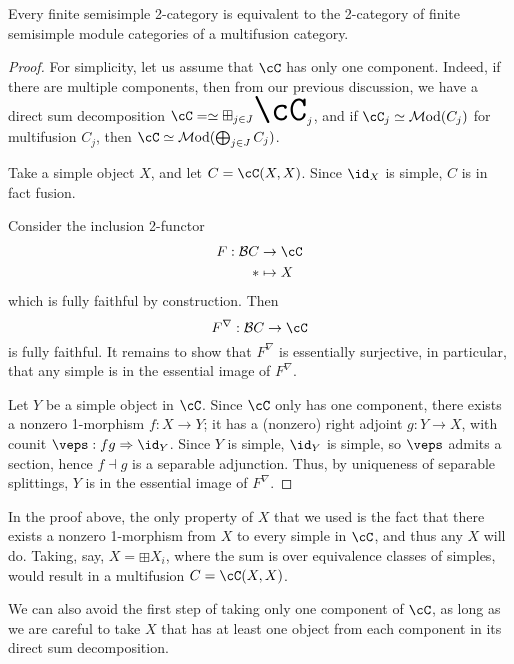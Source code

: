 \documentclass[12pt]{article}
\newcommand{\cB}{{\mathcal{B}}}
\newcommand{\Mod}{{\mathcal{M}\textrm{od}}}
\newcommand{\bigboxplus}{\Huge \boxplus}
\newcommand{\ModA}[1]{{\Mod(#1)}}
\begin{document}
\begin{theorem}
Every finite semisimple 2-category is equivalent to
the 2-category of finite semisimple module categories
of a multifusion category.
\end{theorem}

\begin{proof}
For simplicity, let us assume that $\cC$ has only one component.
Indeed, if there are multiple components,
then from our previous discussion,
we have a direct sum decomposition
$\cC =\simeq \bigboxplus_{j \in J} \cC_j$,
and if $\cC_j \simeq \ModA{C_j}$ for multifusion $C_j$,
then $\cC \simeq \ModA{\bigoplus_{j \in J} C_j}$.

Take a simple object $X$,
and let $C = \cC(X,X)$.
Since $\id_X$ is simple, $C$ is in fact fusion.

Consider the inclusion 2-functor
\begin{align*}
F : \cB C &\to \cC
\\
* &\mapsto X
\end{align*}
which is fully faithful by construction.
Then
\[
F^\nabla: \cB C \to \cC
\]
is fully faithful.
It remains to show that $F^\nabla$ is essentially surjective,
in particular, that any simple is in the essential image
of $F^\nabla$.

Let $Y$ be a simple object in $\cC$.
Since $\cC$ only has one component,
there exists a nonzero 1-morphism
$f: X \to Y$;
it has a (nonzero) right adjoint $g: Y \to X$,
with counit $\veps : fg \Rightarrow \id_Y$.
Since $Y$ is simple, $\id_Y$ is simple,
so $\veps$ admits a section,
hence $f \dashv g$ is a separable adjunction.
Thus, by uniqueness of separable splittings,
$Y$ is in the essential image of $F^\nabla$.
\end{proof}


In the proof above,
the only property of $X$ that we used is the fact that
there exists a nonzero 1-morphism from $X$ to every simple
in $\cC$,
and thus any $X$ will do.
Taking, say, $X = \boxplus X_i$,
where the sum is over equivalence classes of simples,
would result in a multifusion $C = \cC(X,X)$.

We can also avoid the first step of taking only one component
of $\cC$,
as long as we are careful to take $X$
that has at least one object from each component
in its direct sum decomposition.
\end{document}
